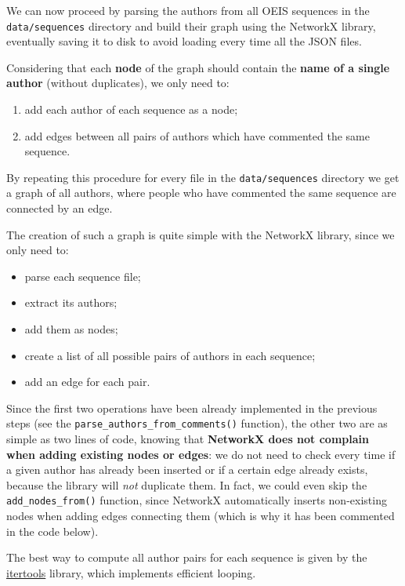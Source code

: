 \documentclass[11pt]{article}
\begin{document}
We can now proceed by parsing the authors from all OEIS sequences in the
\texttt{data/sequences} directory and build their graph using the
NetworkX library, eventually saving it to disk to avoid loading every
time all the JSON files.

Considering that each \textbf{node} of the graph should contain the
\textbf{name of a single author} (without duplicates), we only need to:

\begin{enumerate}
\item add each author of each sequence as a node;
\item add edges between all pairs of authors which have commented the same sequence.
\end{enumerate}
By repeating this procedure for every file in the
\texttt{data/sequences} directory we get a graph of all authors, where
people who have commented the same sequence are connected by an edge.

The creation of such a graph is quite simple with the NetworkX library,
since we only need to:

\begin{itemize}
    \item parse each sequence file; \item extract its
authors; \item add them as nodes; \item create a list of all possible pairs of
authors in each sequence; \item add an edge for each pair.
\end{itemize}

Since the first two operations have been already implemented in the
previous steps (see the \texttt{parse\_authors\_from\_comments()}
function), the other two are as simple as two lines of code, knowing
that \textbf{NetworkX does not complain when adding existing nodes or
edges}: we do not need to check every time if a given author has already
been inserted or if a certain edge already exists, because the library
will \emph{not} duplicate
them\cite{nx_graph}.
In fact, we could even skip the \texttt{add\_nodes\_from()} function,
since NetworkX automatically inserts non-existing nodes when adding
edges connecting them (which is why it has been commented in the code
below).

The best way to compute all author pairs for each sequence is given by
the \href{https://docs.python.org/3/library/itertools.html}{itertools}
library, which implements efficient looping.
\end{document}
